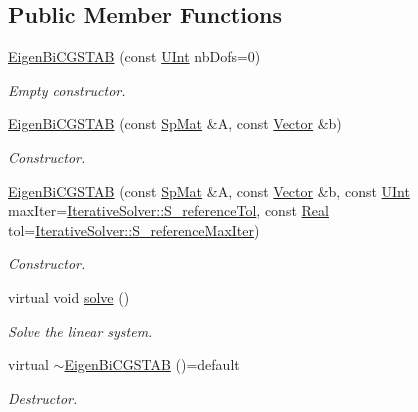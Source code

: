 \subsection*{Public Member Functions}
\begin{DoxyCompactItemize}
\item 
\hyperlink{classFVCode3D_1_1EigenBiCGSTAB_ac59015c91e25ce01ba3ab60a99a58d45}{Eigen\+Bi\+C\+G\+S\+T\+AB} (const \hyperlink{namespaceFVCode3D_a4bf7e328c75d0fd504050d040ebe9eda}{U\+Int} nb\+Dofs=0)
\begin{DoxyCompactList}\small\item\em Empty constructor. \end{DoxyCompactList}\item 
\hyperlink{classFVCode3D_1_1EigenBiCGSTAB_a4253aa72e60111cf80de119b9add6fbf}{Eigen\+Bi\+C\+G\+S\+T\+AB} (const \hyperlink{namespaceFVCode3D_ac1032289d96638cf0ad6c52ef639095f}{Sp\+Mat} \&A, const \hyperlink{namespaceFVCode3D_a16ccf345652402bccd1a5d2e6782526c}{Vector} \&b)
\begin{DoxyCompactList}\small\item\em Constructor. \end{DoxyCompactList}\item 
\hyperlink{classFVCode3D_1_1EigenBiCGSTAB_abb0a20944c75cefecc1caa15584ce023}{Eigen\+Bi\+C\+G\+S\+T\+AB} (const \hyperlink{namespaceFVCode3D_ac1032289d96638cf0ad6c52ef639095f}{Sp\+Mat} \&A, const \hyperlink{namespaceFVCode3D_a16ccf345652402bccd1a5d2e6782526c}{Vector} \&b, const \hyperlink{namespaceFVCode3D_a4bf7e328c75d0fd504050d040ebe9eda}{U\+Int} max\+Iter=\hyperlink{classFVCode3D_1_1IterativeSolver_a2afd68f254311907309444138d7f1b89}{Iterative\+Solver\+::\+S\+\_\+reference\+Tol}, const \hyperlink{namespaceFVCode3D_a40c1f5588a248569d80aa5f867080e83}{Real} tol=\hyperlink{classFVCode3D_1_1IterativeSolver_a938effdbfaa21c23226bfedf904787c2}{Iterative\+Solver\+::\+S\+\_\+reference\+Max\+Iter})
\begin{DoxyCompactList}\small\item\em Constructor. \end{DoxyCompactList}\item 
virtual void \hyperlink{classFVCode3D_1_1EigenBiCGSTAB_a8a5ab1bfdbdbb524a8b5a8b9bce8e83d}{solve} ()
\begin{DoxyCompactList}\small\item\em Solve the linear system. \end{DoxyCompactList}\item 
virtual \hyperlink{classFVCode3D_1_1EigenBiCGSTAB_a0ff4d41d34ce9f852803fdaf0f99c3a9}{$\sim$\+Eigen\+Bi\+C\+G\+S\+T\+AB} ()=default
\begin{DoxyCompactList}\small\item\em Destructor. \end{DoxyCompactList}\end{DoxyCompactItemize}

